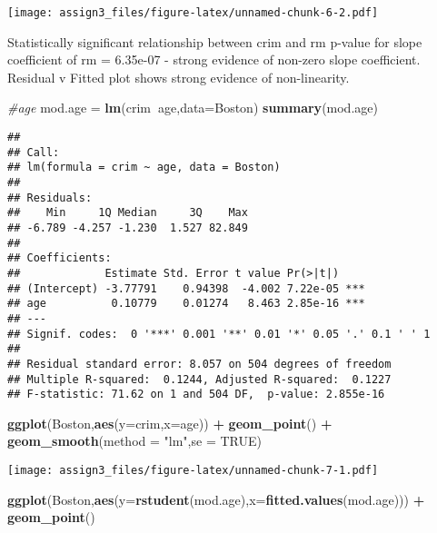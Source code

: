 \documentclass[]{article}
\newenvironment{Shaded}{\begin{snugshade}}{\end{snugshade}}
\newcommand{\CommentTok}[1]{\textcolor[rgb]{0.56,0.35,0.01}{\textit{#1}}}
\newcommand{\DataTypeTok}[1]{\textcolor[rgb]{0.13,0.29,0.53}{#1}}
\newcommand{\KeywordTok}[1]{\textcolor[rgb]{0.13,0.29,0.53}{\textbf{#1}}}
\newcommand{\NormalTok}[1]{#1}
\newcommand{\OperatorTok}[1]{\textcolor[rgb]{0.81,0.36,0.00}{\textbf{#1}}}
\newcommand{\OtherTok}[1]{\textcolor[rgb]{0.56,0.35,0.01}{#1}}
\newcommand{\StringTok}[1]{\textcolor[rgb]{0.31,0.60,0.02}{#1}}
\begin{document}
\texttt{[image: assign3\_files/figure-latex/unnamed-chunk-6-2.pdf]}

Statistically significant relationship between crim and rm p-value for
slope coefficient of rm = 6.35e-07 - strong evidence of non-zero slope
coefficient. Residual v Fitted plot shows strong evidence of
non-linearity.

\begin{Shaded}
\begin{Highlighting}[]
\CommentTok{#age}
\NormalTok{mod.age =}\StringTok{ }\KeywordTok{lm}\NormalTok{(crim}\OperatorTok{~}\NormalTok{age,}\DataTypeTok{data=}\NormalTok{Boston)}
\KeywordTok{summary}\NormalTok{(mod.age)}
\end{Highlighting}
\end{Shaded}

\begin{verbatim}
## 
## Call:
## lm(formula = crim ~ age, data = Boston)
## 
## Residuals:
##    Min     1Q Median     3Q    Max 
## -6.789 -4.257 -1.230  1.527 82.849 
## 
## Coefficients:
##             Estimate Std. Error t value Pr(>|t|)    
## (Intercept) -3.77791    0.94398  -4.002 7.22e-05 ***
## age          0.10779    0.01274   8.463 2.85e-16 ***
## ---
## Signif. codes:  0 '***' 0.001 '**' 0.01 '*' 0.05 '.' 0.1 ' ' 1
## 
## Residual standard error: 8.057 on 504 degrees of freedom
## Multiple R-squared:  0.1244, Adjusted R-squared:  0.1227 
## F-statistic: 71.62 on 1 and 504 DF,  p-value: 2.855e-16
\end{verbatim}

\begin{Shaded}
\begin{Highlighting}[]
\KeywordTok{ggplot}\NormalTok{(Boston,}\KeywordTok{aes}\NormalTok{(}\DataTypeTok{y=}\NormalTok{crim,}\DataTypeTok{x=}\NormalTok{age)) }\OperatorTok{+}\StringTok{ }\KeywordTok{geom_point}\NormalTok{() }\OperatorTok{+}\StringTok{ }\KeywordTok{geom_smooth}\NormalTok{(}\DataTypeTok{method =} \StringTok{"lm"}\NormalTok{,}\DataTypeTok{se =} \OtherTok{TRUE}\NormalTok{)}
\end{Highlighting}
\end{Shaded}

\texttt{[image: assign3\_files/figure-latex/unnamed-chunk-7-1.pdf]}

\begin{Shaded}
\begin{Highlighting}[]
\KeywordTok{ggplot}\NormalTok{(Boston,}\KeywordTok{aes}\NormalTok{(}\DataTypeTok{y=}\KeywordTok{rstudent}\NormalTok{(mod.age),}\DataTypeTok{x=}\KeywordTok{fitted.values}\NormalTok{(mod.age))) }\OperatorTok{+}\StringTok{ }\KeywordTok{geom_point}\NormalTok{() }
\end{Highlighting}
\end{Shaded}
\end{document}
